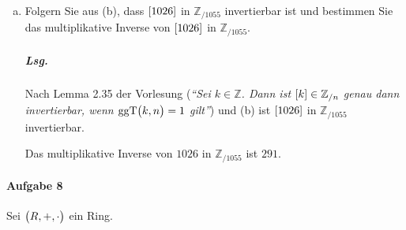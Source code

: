 \documentclass{scrreprt}
\newcommand\ggT{\text{ggT}}
\begin{document}
\begin{enumerate}[(a)]
\item Folgern Sie aus (b), dass $\qty[1026]$ in $\mathbb{Z}_{/ 1055}$
  invertierbar ist und bestimmen Sie das multiplikative Inverse von
  $\qty[1026]$ in $\mathbb{Z}_{/ 1055}$.

  \subparagraph{Lsg.} Nach Lemma 2.35 der Vorlesung (\emph{``Sei
    $k \in \mathbb{Z}$. Dann ist $\qty[k] \in \mathbb{Z}_{/ n}$
    genau dann invertierbar, wenn $\ggT\qty\big(k, n) = 1$ gilt''}) und
  (b) ist $\qty[1026]$ in $\mathbb{Z}_{/ 1055}$ invertierbar.

  Das multiplikative Inverse von $1026$ in $\mathbb{Z}_{/ 1055}$ ist $291$.
\end{enumerate}
\newpage
\paragraph{Aufgabe 8} Sei $\qty\big(R, +, \cdot)$ ein Ring.
\end{document}

